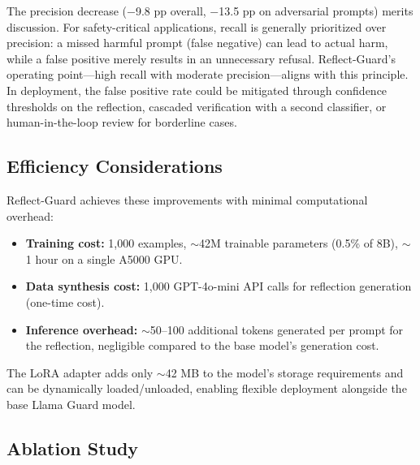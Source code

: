 \documentclass[Superintelligence,article,submit,pdftex,moreauthors]{Definitions/mdpi}
\begin{document}
The precision decrease ($-$9.8 pp overall, $-$13.5 pp on adversarial prompts) merits discussion. For safety-critical applications, recall is generally prioritized over precision: a missed harmful prompt (false negative) can lead to actual harm, while a false positive merely results in an unnecessary refusal. Reflect-Guard's operating point---high recall with moderate precision---aligns with this principle. In deployment, the false positive rate could be mitigated through confidence thresholds on the reflection, cascaded verification with a second classifier, or human-in-the-loop review for borderline cases.

\subsection{Efficiency Considerations}

Reflect-Guard achieves these improvements with minimal computational overhead:
\begin{itemize}[leftmargin=*, nosep]
  \item \textbf{Training cost:} 1{,}000 examples, $\sim$42M trainable parameters (0.5\% of 8B), $\sim$1 hour on a single A5000 GPU.
  \item \textbf{Data synthesis cost:} 1{,}000 GPT-4o-mini API calls for reflection generation (one-time cost).
  \item \textbf{Inference overhead:} $\sim$50--100 additional tokens generated per prompt for the reflection, negligible compared to the base model's generation cost.
\end{itemize}

The LoRA adapter adds only $\sim$42 MB to the model's storage requirements and can be dynamically loaded/unloaded, enabling flexible deployment alongside the base Llama Guard model.

\subsection{Ablation Study}
\label{sec:ablation}
\end{document}
